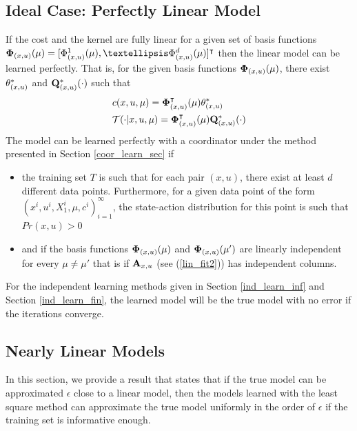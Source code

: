 \documentclass[twoside,11pt]{article}
\begin{document}
\subsection{Ideal Case: Perfectly Linear Model}\label{lin_model} If the cost and the kernel are fully linear for a given set of basis functions ${\bf \Phi}_{(x,u)}(\mu) = [\Phi^1_{(x,u)}(\mu),\dots \Phi^d_{(x,u)}(\mu)]^\intercal$ then the linear model can be learned perfectly. That is, for the given basis functions ${\bf \Phi}_{(x,u)}(\mu) $, there exist ${\bf \theta}^*_{(x,u)}$ and ${\bf Q}^*_{(x,u)}(\cdot)$ such that 
\begin{align*}
&c(x,u,\mu) = {\bf \Phi}_{(x,u)}^\intercal(\mu)\theta^*_{(x,u)}\\
&\mathcal{T}(\cdot|x,u,\mu)= {\bf \Phi}_{(x,u)}^\intercal(\mu) {\bf Q}^*_{(x,u)}(\cdot)
\end{align*}
The model can be learned perfectly with a coordinator under the method presented in Section \ref{coor_learn_sec} if
\begin{itemize}
\item the training set $T$ is such that for each pair $(x,u)$, there exist at least $d$ different data points. Furthermore, for a given data point of the form $(x^i,u^i,X_1^i,\mu,c^i)_{i=1}^\infty$, the  state-action distribution for this point is such that $Pr(x,u)>0$
\item and if the basis functions ${\bf \Phi}_{(x,u)}(\mu)$ and  ${\bf \Phi}_{(x,u)}(\mu')$ are  linearly independent for every $\mu\neq\mu'$ that is if ${\bf A}_{x,u}$ (see (\ref{lin_fit2})) has independent columns.
\end{itemize}

For the independent learning methods given in Section \ref{ind_learn_inf} and Section \ref{ind_learn_fin}, the learned model will be the true model with no error if the iterations converge. 


\subsection{Nearly Linear Models}
In this section, we provide a result that states that if the true model can be approximated $\epsilon$ close to a linear model, then the models learned with the least square method can approximate the true model uniformly in the order of $\epsilon$ if the training set is informative enough.
\end{document}

